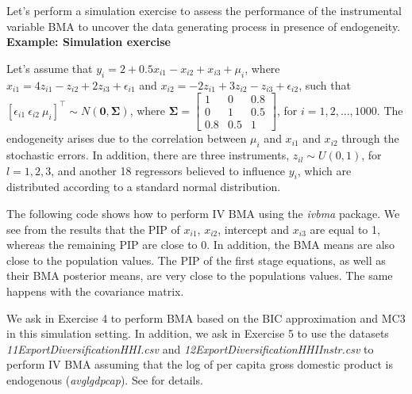 Let's perform a simulation exercise to assess the performance of the instrumental variable BMA to uncover the data generating process in presence of endogeneity.\\

\textbf{Example: Simulation exercise}

Let's assume that $y_i = 2 + 0.5x_{i1} - x_{i2} + x_{i3} + \mu_i$, where $x_{i1} = 4z_{i1} - z_{i2} + 2z_{i3} + \epsilon_{i1}$ and $x_{i2} = -2z_{i1} + 3z_{i2} - z_{i3} + \epsilon_{i2}$, such that $[\epsilon_{i1} \ \epsilon_{i2} \ \mu_i]^{\top} \sim N(\bm{0}, \bm{\Sigma})$, where $\bm{\Sigma} = \begin{bmatrix} 1 & 0 & 0.8 \\ 0 & 1 & 0.5 \\ 0.8 & 0.5 & 1 \end{bmatrix}$, for $i = 1, 2, \dots, 1000$. The endogeneity arises due to the correlation between $\mu_i$ and $x_{i1}$ and $x_{i2}$ through the stochastic errors. In addition, there are three instruments, $z_{il} \sim U(0,1)$, for $l = 1, 2, 3$, and another 18 regressors believed to influence $y_i$, which are distributed according to a standard normal distribution.

The following code shows how to perform IV BMA using the \textit{ivbma} package. We see from the results that the PIP of $x_{i1}$, $x_{i2}$, intercept and $x_{i3}$ are equal to 1, whereas the remaining PIP are close to 0. In addition, the BMA means are also close to the population values. The PIP of the first stage equations, as well as their BMA posterior means, are very close to the populations values. The same happens with the covariance matrix. 

We ask in Exercise 4 to perform BMA based on the BIC approximation and MC3 in this simulation setting. In addition, we ask in Exercise 5 to use the datasets \textit{11ExportDiversificationHHI.csv} and \textit{12ExportDiversificationHHIInstr.csv} to perform IV BMA assuming that the log of per capita gross domestic product is endogenous (\textit{avglgdpcap}). See \cite{Jetter2015} for details.     

